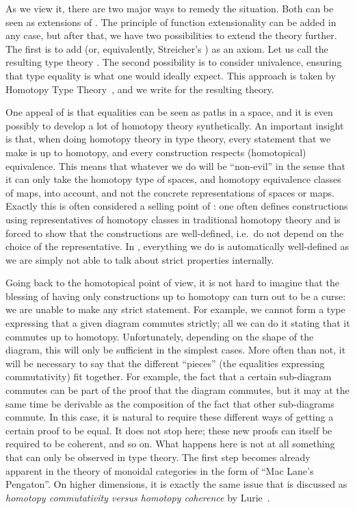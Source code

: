 \documentclass[a4paper,reqno]{amsart}
\theoremstyle{plain}
\theoremstyle{definition}
\begin{document}
As we view it, there are two major ways to remedy the situation.
Both can be seen as extensions of . The principle of function extensionality can be added in any case, but after that, we have two possibilities to extend the theory further.
The first is to add  (or, equivalently, Streicher's ) as an axiom. Let us call the resulting type theory .
The second possibility is to consider univalence, ensuring that type equality is what one would ideally expect.
This approach is taken by Homotopy Type Theory~\cite{HoTTbook}, and we write  for the resulting theory.

One appeal of  is that equalities can be seen as paths in a space, and it is even possibly to develop a lot of homotopy theory synthetically.
An important insight is that, when doing homotopy theory in type theory, every statement that we make is up to homotopy, and every construction respects (homotopical) equivalence. 
This means that whatever we do will be ``non-evil'' in the sense that it can only take the homotopy type of spaces, and homotopy equivalence classes of maps, into account, and not the concrete representations of spaces or maps.
Exactly this is often considered a selling point of : one often defines constructions using representatives of homotopy classes in traditional homotopy theory and is forced to show that the constructions are well-defined, i.e.\ do not depend on the choice of the representative. 
In , everything we do is automatically well-defined as we are simply not able to talk about strict properties internally.

Going back to the homotopical point of view, it is not hard to imagine that the blessing of having only constructions up to homotopy can turn out to be a curse:
we are unable to make any strict statement.
For example, we cannot form a type expressing that a given diagram commutes strictly; all we can do it stating that it commutes up to homotopy.
Unfortunately, depending on the shape of the diagram, this will only be sufficient in the simplest cases.
More often than not, it will be necessary to say that the different ``pieces'' (the equalities expressing commutativity) fit together. 
For example, the fact that a certain sub-diagram commutes can be part of the proof that the diagram commutes, but it may at the same time be derivable as the composition of the fact that other sub-diagrams commute.
In this case, it is natural to require these different ways of getting a certain proof to be equal.
It does not stop here; these new proofs can itself be required to be coherent, and so on.
What happens here is not at all something that can only be observed in type theory.
The first step becomes already apparent in the theory of monoidal categories in the form of ``Mac Lane's Pengaton''.
On higher dimensions, it is exactly the same issue that is discussed as \emph{homotopy commutativity versus homotopy coherence} by Lurie~\cite{Lurie_higherToposTheory}.
\end{document}
